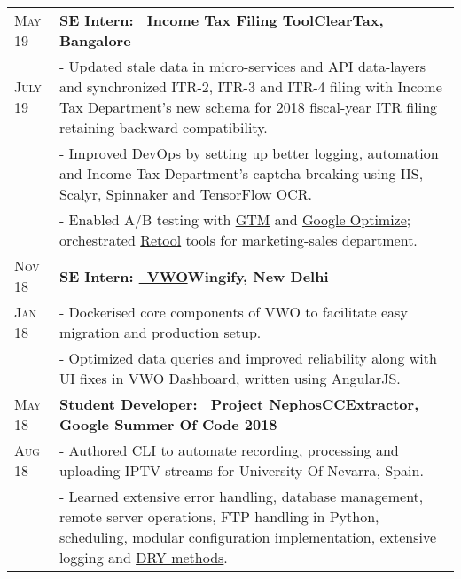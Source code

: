 \documentclass[a4paper,10pt]{extarticle} %
\begin{document}
\begin{tabularx}{\linewidth}{ l | X }

\textsc{May 19} & \textbf{SE Intern: {\href{https://cleartax.in/income-tax-efiling}{\ Income Tax Filing Tool}}}\hfill\textbf{ClearTax, Bangalore}\\
\textsc{July 19}& {- Updated stale data in micro-services and API data-layers and synchronized ITR-2, ITR-3 and ITR-4 filing with Income Tax Department's new schema for 2018 fiscal-year ITR filing retaining backward compatibility.}\\
& {- Improved DevOps by setting up better logging, automation and Income Tax Department's captcha breaking using IIS, Scalyr, Spinnaker and TensorFlow OCR.}\\
& {- Enabled A/B testing with \href{https://tagmanager.google.com/}{GTM} and \href{https://optimize.google.com/optimize/home/}{Google Optimize}; orchestrated \href{https://tryretool.com/}{Retool} tools for marketing-sales department.}\\[2mm]

\textsc{Nov 18} & \textbf{SE Intern: {\href{https://vwo.com/}{\ VWO}}}\hfill\textbf{Wingify, New Delhi}\\
\textsc{Jan 18}& {- Dockerised core components of VWO to facilitate easy migration and production setup.}\\
& {- Optimized data queries and improved reliability along with UI fixes in VWO Dashboard, written using AngularJS.}\\[2mm]

\textsc{May 18} & \textbf{Student Developer: {\href{https://github.com/thealphadollar/Nephos}{\ Project Nephos}}}\hfill\textbf{CCExtractor, Google Summer Of Code 2018}\\
\textsc{Aug 18}& {- Authored CLI to automate recording, processing and uploading IPTV streams for University Of Nevarra, Spain.}\\
& {- Learned extensive error handling, database management, remote server operations, FTP handling in Python, scheduling, modular configuration implementation, extensive logging and \href{https://thealphadollar.github.io/learning/2019/05/13/go-dry.html}{DRY methods}.}\\

\end{tabularx}

\vspace{-0.1cm}
\end{document}
